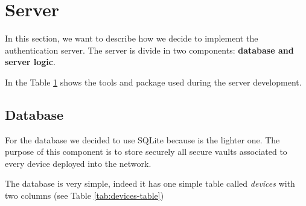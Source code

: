 \section{Server}
In this section, we want to describe how we decide to implement the authentication server. The server is divide in two components: \textbf{database and server logic}.

In the Table \ref{tab:tools-table} shows the tools and package used during the server development.
\begin{figure}[h]
    \begin{minipage}{.48\textwidth}
        \label{tab:tools-table}
        \vspace{.5\baselineskip}
    \end{minipage}
\end{figure}
\subsection{Database}
For the database we decided to use SQLite because is the lighter one.
The purpose of this component is to store securely all secure vaults associated to every device deployed into the network.

The database is very simple, indeed it has one simple table called \textit{devices} with two columns (see Table \ref{tab:devices-table})

